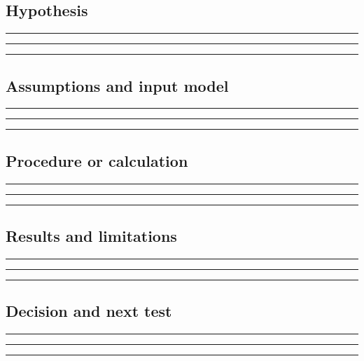\documentclass[11pt]{article}
\begin{document}
\subsection{Hypothesis}
\noindent\rule{\linewidth}{0.35pt}\par\vspace{0.22in}
\noindent\rule{\linewidth}{0.35pt}\par\vspace{0.22in}
\noindent\rule{\linewidth}{0.35pt}\par\vspace{0.18in}

\subsection{Assumptions and input model}
\noindent\rule{\linewidth}{0.35pt}\par\vspace{0.22in}
\noindent\rule{\linewidth}{0.35pt}\par\vspace{0.22in}
\noindent\rule{\linewidth}{0.35pt}\par\vspace{0.18in}

\subsection{Procedure or calculation}
\noindent\rule{\linewidth}{0.35pt}\par\vspace{0.22in}
\noindent\rule{\linewidth}{0.35pt}\par\vspace{0.22in}
\noindent\rule{\linewidth}{0.35pt}\par\vspace{0.18in}

\subsection{Results and limitations}
\noindent\rule{\linewidth}{0.35pt}\par\vspace{0.22in}
\noindent\rule{\linewidth}{0.35pt}\par\vspace{0.22in}
\noindent\rule{\linewidth}{0.35pt}\par\vspace{0.18in}

\subsection{Decision and next test}
\noindent\rule{\linewidth}{0.35pt}\par\vspace{0.22in}
\noindent\rule{\linewidth}{0.35pt}\par\vspace{0.22in}
\noindent\rule{\linewidth}{0.35pt}\par\vspace{0.18in}
\end{document}
